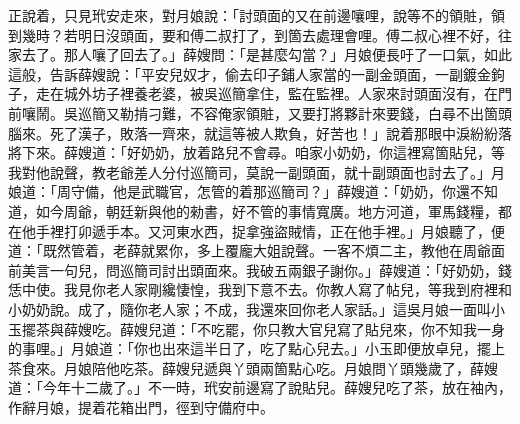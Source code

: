 正說着，只見玳安走來，對月娘說：「討頭面的又在前邊嚷哩，說等不的領賍，領到幾時？若明日沒頭面，要和傅二叔打了，到箇去處理會哩。傅二叔心裡不好，往家去了。那人嚷了回去了。」薛嫂問：「是甚麼勾當？」月娘便長吁了一口氣，如此這般，告訴薛嫂說：「平安兒奴才，偷去印子鋪人家當的一副金頭面，一副鍍金鉤子，走在城外坊子裡養老婆，被吳巡簡拿住，監在監裡。人家來討頭面沒有，在門前嚷鬧。吳巡簡又勒掯刁難，不容俺家領賍，又要打將夥計來要錢，白尋不出箇頭腦來。死了漢子，敗落一齊來，就這等被人欺負，好苦也！」說着那眼中淚紛紛落將下來。{}薛嫂道：「好奶奶，放着路兒不會尋。咱家小奶奶，你這裡寫箇貼兒，等我對他說聲，教老爺差人分付巡簡司，莫說一副頭面，就十副頭面也討去了。」月娘道：「周守備，他是武職官，怎管的着那巡簡司？」薛嫂道：「奶奶，你還不知道，如今周爺，朝廷新與他的勑書，好不管的事情寬廣。地方河道，軍馬錢糧，都在他手裡打卯遞手本。又河東水西，捉拿強盜賊情，正在他手裡。」月娘聽了，便道：「既然管着，老薛就累你，多上覆龐大姐說聲。一客不煩二主，教他在周爺面前美言一句兒，問巡簡司討出頭面來。我破五兩銀子謝你。」薛嫂道：「好奶奶，錢恁中使。我見你老人家剛纔悽惶，我到下意不去。你教人寫了帖兒，等我到府裡和小奶奶說。成了，隨你老人家；不成，我還來回你老人家話。」這吳月娘一面叫小玉擺茶與薛嫂吃。薛嫂兒道：「不吃罷，你只教大官兒寫了貼兒來，你不知我一身的事哩。」月娘道：「你也出來這半日了，吃了點心兒去。」小玉即便放卓兒，擺上茶食來。月娘陪他吃茶。薛嫂兒遞與丫頭兩箇點心吃。月娘問丫頭幾歲了，薛嫂道：「今年十二歲了。」不一時，玳安前邊寫了說貼兒。薛嫂兒吃了茶，放在袖內，作辭月娘，提着花箱出門，徑到守備府中。

